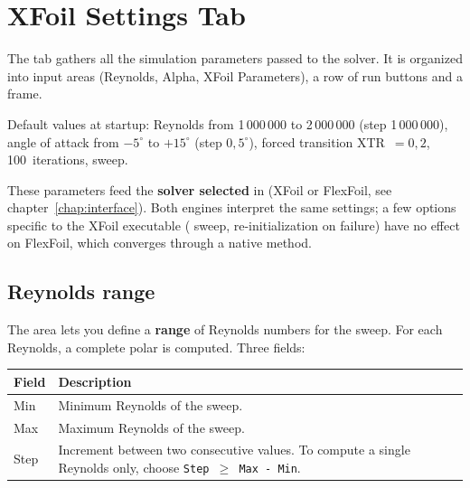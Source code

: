 \chapter{XFoil Settings Tab}
\label{chap:xfoil}

The  tab gathers all the simulation parameters
passed to the solver. It is organized into input areas (Reynolds,
Alpha, XFoil Parameters), a row of run buttons and a
 frame.


\begin{noteinfo}
Default values at startup: Reynolds from 1\,000\,000 to
2\,000\,000 (step 1\,000\,000), angle of attack from $-5^\circ$ to $+15^\circ$
(step $0{,}5^\circ$), forced transition XTR~$=0{,}2$, 100~iterations,
 sweep.
\end{noteinfo}

\begin{noteinfo}
These parameters feed the \textbf{solver selected} in
 (XFoil or FlexFoil, see
chapter~\ref{chap:interface}). Both engines interpret the same settings;
a few options specific to the XFoil executable ( sweep,
re-initialization on failure) have no effect on FlexFoil, which
converges through a native method.
\end{noteinfo}

\section{Reynolds range}

The  area lets you define a \textbf{range} of
Reynolds numbers for the sweep. For each Reynolds, a
complete polar is computed. Three fields:

\begin{tabularx}{\linewidth}{l X}
    \toprule
    \textbf{Field} & \textbf{Description} \\
    \midrule
    Min  & Minimum Reynolds of the sweep. \\
    Max  & Maximum Reynolds of the sweep. \\
    Step & Increment between two consecutive values. To
           compute a single Reynolds only, choose
           \texttt{Step $\geq$ Max - Min}. \\
    \bottomrule
\end{tabularx}



